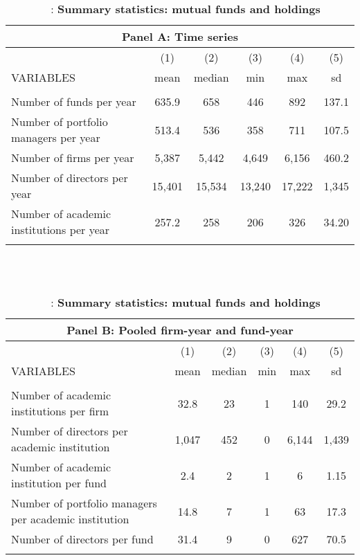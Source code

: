 \documentclass[11pt]{article}
\begin{document}
\begin{doublespace}
\begin{table}
\caption{ \ \ : \large \bf Summary statistics: mutual funds and holdings}
\vspace*{10mm}
\begin{tabular}{lccccc}
\multicolumn{6}{c}{Panel A: Time series} \\ \hline
 & (1) & (2) & (3) & (4) & (5) \\
VARIABLES & mean & median & min & max & sd \\ \hline
 &  &  &  &  &  \\
Number of funds per year & 635.9 & 658 & 446 & 892 & 137.1 \\
Number of portfolio managers per year & 513.4 & 536 & 358 & 711 & 107.5 \\
Number of firms per year & 5,387 & 5,442 & 4,649 & 6,156 & 460.2 \\
Number of directors per year & 15,401 & 15,534 & 13,240 & 17,222 & 1,345 \\
Number of academic institutions per year & 257.2 & 258 & 206 & 326 & 34.20 \\
 &  &  &  &  &  \\ \hline
\end{tabular}
\\
\vspace*{10mm}
\\
\begin{tabular}{lccccc}
\multicolumn{6}{c}{Panel B: Pooled firm-year and fund-year} \\ \hline
 & (1) & (2) & (3) & (4) & (5) \\
VARIABLES & mean & median & min & max & sd \\ \hline
 &  &  &  &  &  \\
Number of academic institutions per firm & 32.8 & 23 & 1 & 140 & 29.2 \\
Number of directors per academic institution & 1,047 & 452 & 0 & 6,144 & 1,439 \\
Number of academic institution per fund & 2.4 & 2 & 1 & 6 & 1.15 \\
Number of portfolio managers per academic institution & 14.8 & 7 & 1 & 63 & 17.3 \\
Number of directors per fund & 31.4 & 9 & 0 & 627 & 70.5 \\
 &  &  &  &  &  \\ \hline
\end{tabular}
\vspace*{10mm}
\label{table:1}
\end{table}


\end{doublespace}
\end{document}
